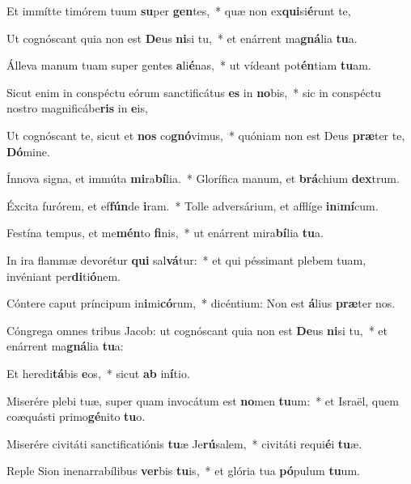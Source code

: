 \item Et immítte timórem tuum \textbf{su}per \textbf{gen}tes,~* quæ non ex\textbf{qui}si\textbf{é}runt te,
\item Ut cognóscant quia non est \textbf{De}us \textbf{ni}si tu,~* et enárrent ma\textbf{gná}lia \textbf{tu}a.
\item Álleva manum tuam super gentes \textbf{a}li\textbf{é}nas,~* ut vídeant pot\textbf{én}tiam \textbf{tu}am.
\item Sicut enim in conspéctu eórum sanctificátus \textbf{es} in \textbf{no}bis,~* sic in conspéctu nostro magnificábe\textbf{ris} in \textbf{e}is,
\item Ut cognóscant te, sicut et \textbf{nos} co\textbf{gnó}vimus,~* quóniam non est Deus \textbf{præ}ter te, \textbf{Dó}mine.
\item Ínnova signa, et immúta \textbf{mi}ra\textbf{bí}lia.~* Glorífica manum, et \textbf{brá}chium \textbf{dex}trum.
\item Éxcita furórem, et ef\textbf{fún}de \textbf{i}ram.~* Tolle adversárium, et afflíge \textbf{in}i\textbf{mí}cum.
\item Festína tempus, et me\textbf{mén}to \textbf{fi}nis,~* ut enárrent mira\textbf{bí}lia \textbf{tu}a.
\item In ira flammæ devorétur \textbf{qui} sal\textbf{vá}tur:~* et qui péssimant plebem tuam, invéniant per\textbf{di}ti\textbf{ó}nem.
\item Cóntere caput príncipum in\textbf{i}mi\textbf{có}rum,~* dicéntium: Non est \textbf{á}lius \textbf{præ}ter nos.
\item Cóngrega omnes tribus Jacob: ut cognóscant quia non est \textbf{De}us \textbf{ni}si tu,~* et enárrent ma\textbf{gná}lia \textbf{tu}a:
\item Et heredi\textbf{tá}bis \textbf{e}os,~* sicut \textbf{ab} in\textbf{í}tio.
\item Miserére plebi tuæ, super quam invocátum est \textbf{no}men \textbf{tu}um:~* et Israël, quem coæquásti primo\textbf{gé}nito \textbf{tu}o.
\item Miserére civitáti sanctificatiónis \textbf{tu}æ Je\textbf{rú}salem,~* civitáti requi\textbf{é}i \textbf{tu}æ.
\item Reple Sion inenarrabílibus \textbf{ver}bis \textbf{tu}is,~* et glória tua \textbf{pó}pulum \textbf{tu}um.

